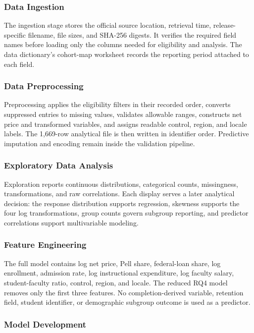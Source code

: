 \documentclass[12pt,a4paper]{article}
\begin{document}
\subsubsection{Data Ingestion}

The ingestion stage stores the official source location, retrieval time, release-specific filename, file sizes, and SHA-256 digests. It verifies the required field names before loading only the columns needed for eligibility and analysis. The data dictionary's cohort-map worksheet records the reporting period attached to each field.

\subsubsection{Data Preprocessing}

Preprocessing applies the eligibility filters in their recorded order, converts suppressed entries to missing values, validates allowable ranges, constructs net price and transformed variables, and assigns readable control, region, and locale labels. The 1,669-row analytical file is then written in identifier order. Predictive imputation and encoding remain inside the validation pipeline.

\subsubsection{Exploratory Data Analysis}

Exploration reports continuous distributions, categorical counts, missingness, transformations, and raw correlations. Each display serves a later analytical decision: the response distribution supports regression, skewness supports the four log transformations, group counts govern subgroup reporting, and predictor correlations support multivariable modeling.

\subsubsection{Feature Engineering}

The full model contains log net price, Pell share, federal-loan share, log enrollment, admission rate, log instructional expenditure, log faculty salary, student-faculty ratio, control, region, and locale. The reduced RQ4 model removes only the first three features. No completion-derived variable, retention field, student identifier, or demographic subgroup outcome is used as a predictor.

\subsubsection{Model Development}
\end{document}
